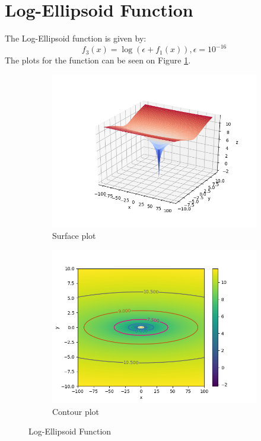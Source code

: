\documentclass[a4paper]{article}
\begin{document}
\section{Log-Ellipsoid Function}
\label{sec:log-ellipsoid}
The Log-Ellipsoid function is given by:
\[
f_{3}(x)=\log \left(\epsilon+f_{1}(x)\right), \epsilon=10^{-16}
\]
The plots for the function can be seen on Figure \ref{plt3}.

\begin{figure}[H]
  \centering
  \begin{subfigure}[b]{0.49\textwidth}
    \centering
    \includegraphics[width=\textwidth]{imgs/plt31}
    \caption{Surface plot}
  \end{subfigure}
  \begin{subfigure}[b]{0.49\textwidth}
    \centering
    \includegraphics[width=\textwidth]{imgs/plt32}
    \caption{Contour plot}
  \end{subfigure}
  \caption{Log-Ellipsoid Function}
  \label{plt3}
\end{figure}
\end{document}
